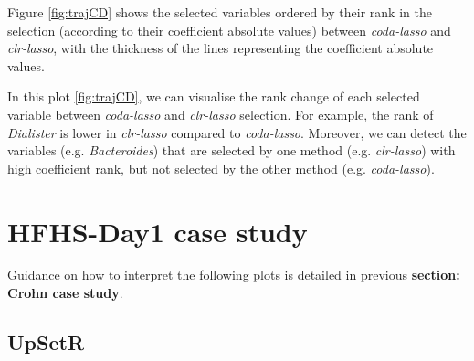 \documentclass[openany]{book}
\begin{document}
Figure \ref{fig:trajCD} shows the selected variables ordered by their
rank in the selection (according to their coefficient absolute values)
between \emph{coda-lasso} and \emph{clr-lasso}, with the thickness of
the lines representing the coefficient absolute values.

In this plot \ref{fig:trajCD}, we can visualise the rank change of each
selected variable between \emph{coda-lasso} and \emph{clr-lasso}
selection. For example, the rank of \emph{Dialister} is lower in
\emph{clr-lasso} compared to \emph{coda-lasso}. Moreover, we can detect
the variables (e.g. \emph{Bacteroides}) that are selected by one method
(e.g. \emph{clr-lasso}) with high coefficient rank, but not selected by
the other method (e.g. \emph{coda-lasso}).

\section{HFHS-Day1 case study}\label{hfhs-day1-case-study-3}

Guidance on how to interpret the following plots is detailed in previous
\textbf{section: Crohn case study}.

\subsection{UpSetR}\label{upsetr-1}
\end{document}
